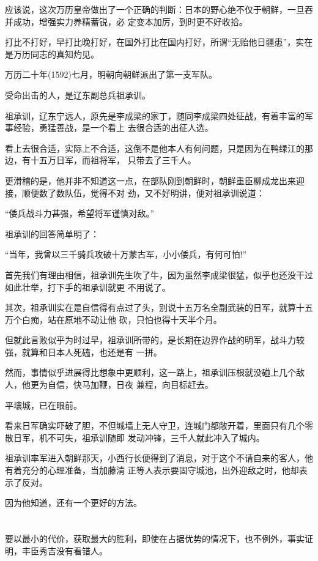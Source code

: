 \documentclass[11pt,a4paper,onecolumn]{article}
\begin{document}
应该说，这次万历皇帝做出了一个正确的判断：日本的野心绝不仅于朝鲜，一旦吞并成功，增强实力养精蓄锐，必
定变本加厉，到时更不好收拾。

打比不打好，早打比晚打好，在国外打比在国内打好，所谓``无贻他日疆患''，实在是万历同志的真知灼见。

万历二十年(1592)七月，明朝向朝鲜派出了第一支军队。

受命出击的人，是辽东副总兵祖承训。

祖承训，辽东宁远人，原先是李成梁的家丁，随同李成梁四处征战，有着丰富的军事经验，勇猛善战，是一个看上
去很合适的出征人选。

看上去很合适，实际上不合适，这倒不是他本人有何问题，只是因为在鸭绿江的那边，有十五万日军，而祖将军，
只带去了三千人。

更滑稽的是，他并非不知道这一点，在部队刚到朝鲜时，朝鲜重臣柳成龙出来迎接，顺便数了数队伍，觉得不对
劲，又不好明讲，便对祖承训说道：

``倭兵战斗力甚强，希望将军谨慎对敌。''

祖承训的回答简单明了：

``当年，我曾以三千骑兵攻破十万蒙古军，小小倭兵，有何可怕!''

首先我们有理由相信，祖承训先生吹了牛，因为虽然李成梁很猛，似乎也还没干过如此壮举，打下手的祖承训就更
不用说了。

其次，祖承训实在是自信得有点过了头，别说十五万名全副武装的日军，就算十五万个白痴，站在原地不动让他
砍，只怕也得十天半个月。

但就此言败似乎为时过早，祖承训所带的，是长期在边界作战的明军，战斗力较强，就算和日本人死磕，也还是有
一拼。

然而，事情似乎进展得比想象中更顺利，这一路上，祖承训压根就没碰上几个敌人，他更为自信，快马加鞭，日夜
兼程，向目标赶去。

平壤城，已在眼前。

看来日军确实吓破了胆，不但城墙上无人守卫，连城门都敞开着，里面只有几个零散日军，机不可失，祖承训随即
发动冲锋，三千人就此冲入了城内。

祖承训率军进入朝鲜那天，小西行长便得到了消息，对于这个不请自来的客人，他有着充分的心理准备，当加藤清
正等人表示要固守城池，出外迎敌之时，他却表示了反对。

因为他知道，还有一个更好的方法。

\section[\thesection]{}

要以最小的代价，获取最大的胜利，即使在占据优势的情况下，也不例外，事实证明，丰臣秀吉没有看错人。
\end{document}
